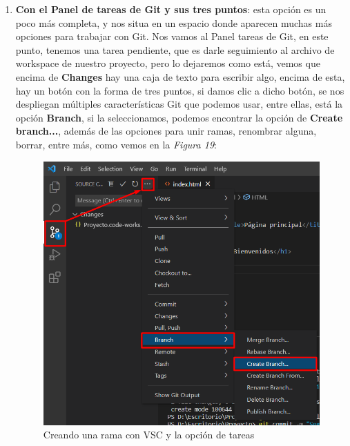 \begin{enumerate}
    \item \textbf{Con el Panel de tareas de Git y sus tres puntos}: esta opción es un poco más completa, y nos situa en un espacio donde aparecen muchas más opciones para trabajar con Git. Nos vamos al Panel tareas de Git, en este punto, tenemos una tarea pendiente, que es darle seguimiento al archivo de workspace de nuestro proyecto, pero lo dejaremos como está, vemos que encima de \textbf{Changes} hay una caja de texto para escribir algo, encima de esta, hay un botón con la forma de tres puntos, si damos clic a dicho botón, se nos despliegan múltiples características Git que podemos usar, entre ellas, está la opción \textbf{Branch}, si la seleccionamos, podemos encontrar la opción de \textbf{Create branch...}, además de las opciones para unir ramas, renombrar alguna, borrar, entre más, como vemos en la \textit{Figura 19}:
    \begin{figure}[H]
        \begin{center}
            \caption{Creando una rama con VSC y la opción de tareas}
            \label{fig: 19}
            \includegraphics[width=14cm]{capturas/creando_b2.png}
        \end{center}
    \end{figure}
\end{enumerate}



